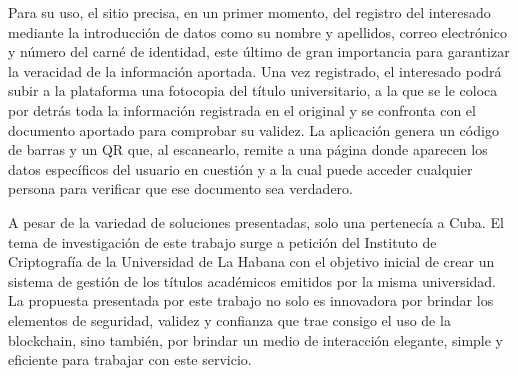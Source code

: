 Para su uso, el sitio precisa, en un primer momento, del registro del interesado mediante la introducción de datos como su nombre y apellidos, correo electrónico y número del carné de identidad, este último de gran importancia para garantizar la veracidad de la información aportada. Una vez registrado, el interesado podrá subir a la plataforma una fotocopia del título universitario, a la que se le coloca por detrás toda la información registrada en el original y se confronta con el documento aportado para comprobar su validez. La aplicación genera un código de barras y un QR que, al escanearlo, remite a una página donde aparecen los datos específicos del usuario en cuestión y a la cual puede acceder cualquier persona para verificar que ese documento sea verdadero.





A pesar de la variedad de soluciones presentadas, solo una pertenecía a Cuba. El tema de investigación de este trabajo surge a petición del Instituto de Criptografía de la Universidad de La Habana con el objetivo inicial de crear un sistema de gestión de los títulos académicos emitidos por la misma universidad. La propuesta presentada por este trabajo no solo es innovadora por brindar los elementos de seguridad, validez y confianza que trae consigo el uso de la blockchain, sino también, por brindar un medio de interacción elegante, simple y eficiente para trabajar con este servicio.

